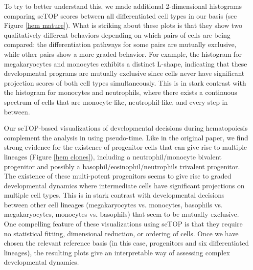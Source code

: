 \documentclass[aps,superscriptaddress, notitlepage,longbibliography]{revtex4-1}
\begin{document}
To try to better understand this, we made additional 2-dimensional histograms comparing scTOP scores between all differentiated cell types in our basis (see Figure \ref{hem mature}). What is striking about these plots is that they show two qualitatively different behaviors depending on which pairs of cells are being compared: the differentiation pathways for some pairs are mutually exclusive, while other pairs show a more graded behavior. For example, the histogram for megakaryocytes and monocytes exhibits a distinct L-shape, indicating that these developmental programs are mutually exclusive since cells never have significant projection scores of both cell types simultaneously. This is in stark contrast with the histogram for monocytes and neutrophils, where there exists a continuous spectrum of cells that are monocyte-like, neutrophil-like, and every step in between. 

Our scTOP-based visualizations of developmental decisions during hematopoiesis complement the analysis in \cite{weinreb_lineage_2020} using pseudo-time. Like in the original paper, we find strong evidence for the existence of progenitor cells that can give rise to multiple lineages (Figure \ref{hem clones}), including a neutrophil/monocyte bivalent progenitor and possibly a basophil/eosinophil/neutrophils trivalent progenitor.  The existence of these multi-potent progenitors seems to give rise to graded developmental dynamics where intermediate cells have significant projections on multiple cell types. This is in stark contrast with developmental decisions between other cell lineages (megakaryocytes vs. monocytes, basophils vs. megakaryocytes, monocytes vs. basophils) that seem to be mutually exclusive. One compelling feature of these visualizations using scTOP is that they require no statistical fitting, dimensional reduction, or ordering of cells. Once we have chosen the relevant reference basis (in this case, progenitors and six differentiated lineages), the resulting plots give an interpretable way of assessing complex developmental dynamics.
\end{document}
